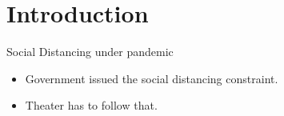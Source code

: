 
\section{Introduction}
\frame{\sectionpage}

\begin{frame}{Social Distancing under pandemic}
  \begin{itemize}
    \item Government issued the social distancing constraint.
    \vspace*{2cm}
    \item Theater has to follow that.
  \end{itemize}
  \end{frame}
